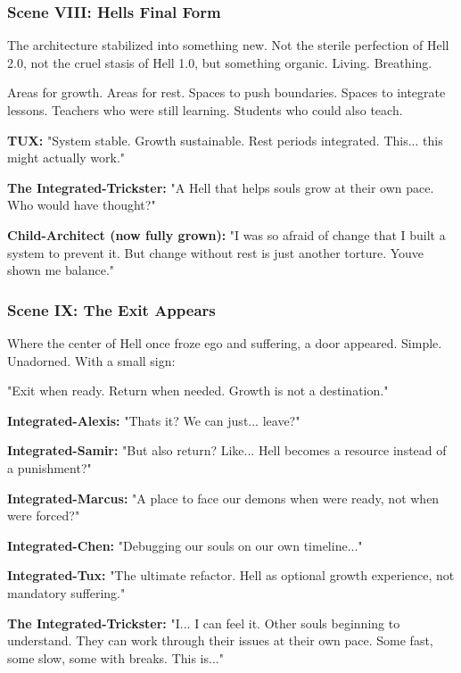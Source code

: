 \bookdivider

\subsubsection{Scene VIII: Hell\textquotesingle s Final Form}\label{scene-viii-hells-final-form}

The architecture stabilized into something new. Not the sterile perfection of Hell 2.0, not the cruel stasis of Hell 1.0, but something organic. Living. Breathing.

Areas for growth. Areas for rest. Spaces to push boundaries. Spaces to integrate lessons. Teachers who were still learning. Students who could also teach.

\textbf{TUX:} "System stable. Growth sustainable. Rest periods integrated. This... this might actually work."

\textbf{The Integrated-Trickster:} "A Hell that helps souls grow at their own pace. Who would have thought?"

\textbf{Child-Architect (now fully grown):} "I was so afraid of change that I built a system to prevent it. But change without rest is just another torture. You\textquotesingle ve shown me balance."

\bookdivider

\subsubsection{Scene IX: The Exit Appears}\label{scene-ix-the-exit-appears}

Where the center of Hell once froze ego and suffering, a door appeared. Simple. Unadorned. With a small sign:

"Exit when ready. Return when needed. Growth is not a destination."

\textbf{Integrated-Alexis:} "That\textquotesingle s it? We can just... leave?"

\textbf{Integrated-Samir:} "But also return? Like... Hell becomes a resource instead of a punishment?"

\textbf{Integrated-Marcus:} "A place to face our demons when we\textquotesingle re ready, not when we\textquotesingle re forced?"

\textbf{Integrated-Chen:} "Debugging our souls on our own timeline..."

\textbf{Integrated-Tux:} "The ultimate refactor. Hell as optional growth experience, not mandatory suffering."

\textbf{The Integrated-Trickster:} "I... I can feel it. Other souls beginning to understand. They can work through their issues at their own pace. Some fast, some slow, some with breaks. This is..."

